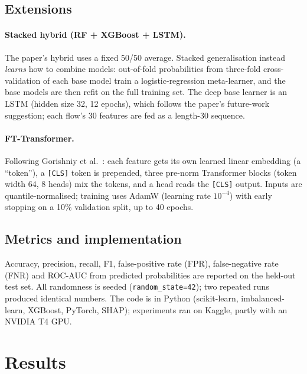 \documentclass[11pt,a4paper]{article}
\begin{document}
\subsection{Extensions}
\label{sec:novel}
\paragraph{Stacked hybrid (RF + XGBoost + LSTM).} The paper's hybrid uses a fixed 50/50 average. Stacked
generalisation instead \emph{learns} how to combine models: out-of-fold probabilities from three-fold
cross-validation of each base model train a logistic-regression meta-learner, and the base models are then refit on
the full training set. The deep base learner is an LSTM (hidden size 32, 12 epochs), which follows the paper's
future-work suggestion; each flow's 30 features are fed as a length-30 sequence.

\paragraph{FT-Transformer.} Following Gorishniy et al.\ \cite{gorishniy2021}: each feature gets its own learned
linear embedding (a ``token''), a \texttt{[CLS]} token is prepended, three pre-norm Transformer blocks (token width
64, 8 heads) mix the tokens, and a head reads the \texttt{[CLS]} output. Inputs are quantile-normalised; training
uses AdamW (learning rate $10^{-4}$) with early stopping on a 10\% validation split, up to 40 epochs.

\subsection{Metrics and implementation}
Accuracy, precision, recall, F1, false-positive rate (FPR), false-negative rate (FNR) and ROC-AUC from predicted
probabilities are reported on the held-out test set. All randomness is seeded (\texttt{random\_state=42}); two
repeated runs produced identical numbers. The code is in Python (scikit-learn, imbalanced-learn, XGBoost, PyTorch,
SHAP); experiments ran on Kaggle, partly with an NVIDIA T4 GPU.

\section{Results}
\end{document}
